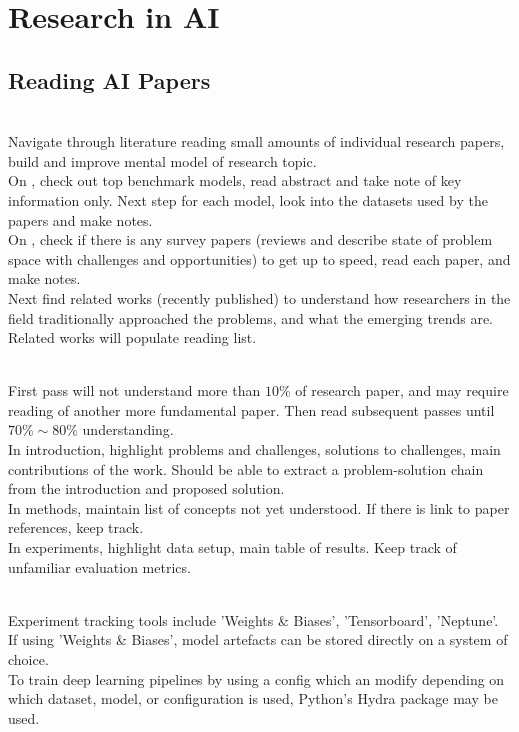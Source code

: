 \section{Research in AI}

\subsection{Reading AI Papers}

\begin{remark} \\
Navigate through literature reading small amounts of individual research papers, build and improve mental model of research topic.\\
On , check out top benchmark models, read abstract and take note of key information only. Next step for each model, look into the datasets used by the papers and make notes.\\
On , check if there is any survey papers (reviews and describe state of problem space with challenges and opportunities) to get up to speed, read each paper, and make notes.\\
Next find related works (recently published) to understand how researchers in the field traditionally approached the problems, and what the emerging trends are. Related works will populate reading list.
\end{remark}

\begin{remark} \\
First pass will not understand more than $10\%$ of research paper, and may require reading of another more fundamental paper. Then read subsequent passes until $70\% \sim 80\%$ understanding.\\
In introduction, highlight problems and challenges, solutions to challenges, main contributions of the work. Should be able to extract a problem-solution chain from the introduction and proposed solution.\\
In methods, maintain list of concepts not yet understood. If there is link to paper references, keep track.\\
In experiments, highlight data setup, main table of results. Keep track of unfamiliar evaluation metrics.
\end{remark}

\begin{remark} \\
Experiment tracking tools include 'Weights \& Biases', 'Tensorboard', 'Neptune'.\\
If using 'Weights \& Biases', model artefacts can be stored directly on a system of choice.\\
To train deep learning pipelines by using a config which an modify depending on which dataset, model, or configuration is used, Python's Hydra package may be used.
\end{remark}

